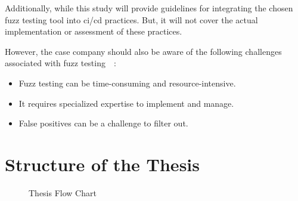 Additionally, while this study will provide guidelines for
integrating the chosen fuzz testing tool into \acrshort{ci/cd} practices. But,
it will not cover the actual implementation or assessment of these practices.

However, the case company should also be aware of the following challenges
associated with fuzz testing~\cite{liang2018fuzz}~\cite{takanen2018fuzzing}:

\begin{itemize}
\item Fuzz testing can be time-consuming and resource-intensive.
\item It requires specialized expertise to implement and manage.
\item False positives can be a challenge to filter out.
\end{itemize}


\clearpage

\section{Structure of the Thesis}
\begin{figure}[H]
      \centering
      \caption{Thesis Flow Chart}\label{fig:thes_str.png}
\end{figure}

\clearpage